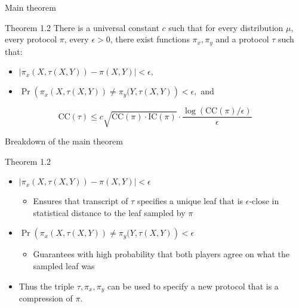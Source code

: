 \documentclass[10pt]{beamer}
\newcommand\CC{\textrm{CC}}
\newcommand\IC{\textrm{IC}}
\begin{document}
\begin{frame}{Main theorem}
\begin{alertblock}{Theorem 1.2}
	There is a universal constant $c$ such that for every distribution $\mu$, every protocol $\pi$, every $\epsilon > 0$, there exist functions $\pi_x, \pi_y$ and a protocol $\tau$ such that:
	\begin{itemize}
	    \item $|\pi_x(X, \tau(X, Y)) - \pi(X, Y)| < \epsilon,$
	    \vskip 0.4cm
	    \item $\Pr \left( \pi_x(X, \tau(X, Y)) \neq \pi_y(Y, \tau(X, Y) \right) < \epsilon,$ and 
	    \vskip 0.6cm
	\end{itemize}
	$$ \CC(\tau) \leq c \sqrt{\CC(\pi) \cdot \IC(\pi)} \cdot \frac{\log(\CC(\pi)/\epsilon)}{\epsilon} $$
\end{alertblock}
\end{frame}

\begin{frame}{Breakdown of the main theorem}
\begin{alertblock}{Theorem 1.2}
	\begin{itemize}
	    \pause
	    \item $|\pi_x(X, \tau(X, Y)) - \pi(X, Y)| < \epsilon$
	    \vskip 0.2cm
	    \begin{itemize}
	        \item Ensures that transcript of $\tau$ specifies a unique leaf that is $\epsilon$-close in statistical distance to the leaf sampled by $\pi$
	    \end{itemize}
	        \pause
	        
	    \vskip 0.2cm
	    \item $\Pr \left( \pi_x(X, \tau(X, Y)) \neq \pi_y(Y, \tau(X, Y) \right) < \epsilon$
	    \vskip 0.2cm
	    \begin{itemize}
	        \item Guarantees with high probability that both players agree on what the sampled leaf was
	    \end{itemize}
	    \vskip 0.4cm
	        \pause
	    \item Thus the triple $\tau, \pi_x, \pi_y$ can be used to specify a new protocol that is a compression of $\pi$.
	\end{itemize}
\end{alertblock}
\end{frame}
\end{document}
